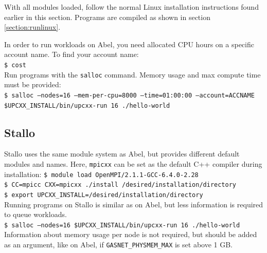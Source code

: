 \documentclass{uit-report}
\begin{document}
With all modules loaded, follow the normal Linux installation instructions found earlier in this section. Programs are compiled as shown in section \ref{section:runlinux}.

In order to run workloads on Abel, you need allocated CPU hours on a specific account name. To find your account name:\\
\phantom{11111} \texttt{\$ cost}\\
Run programs with the \texttt{salloc} command. Memory usage and max compute time must be provided:\\
\phantom{11111} \texttt{\$ salloc --nodes=16 --mem-per-cpu=8000 --time=01:00:00 --account=ACCNAME \$UPCXX\_INSTALL/bin/upcxx-run 16 ./hello-world}\\

\subsection{Stallo}
Stallo uses the same module system as Abel, but provides different default modules and names. Here, \texttt{mpicxx} can be set as the default C++ compiler during installation:
\phantom{11111} \texttt{\$ module load OpenMPI/2.1.1-GCC-6.4.0-2.28}\\
\phantom{11111} \texttt{\$ CC=mpicc CXX=mpicxx ./install /desired/installation/directory}\\
\phantom{11111} \texttt{\$ export UPCXX\_INSTALL=/desired/installation/directory}\\

Running programs on Stallo is similar as on Abel, but less information is required to queue workloads.\\
\phantom{11111} \texttt{\$ salloc --nodes=16 \$UPCXX\_INSTALL/bin/upcxx-run 16 ./hello-world}\\
Information about memory usage per node is not required, but should be added as an argument, like on Abel, if \texttt{GASNET\_PHYSMEM\_MAX} is set above 1 GB.
\end{document}
